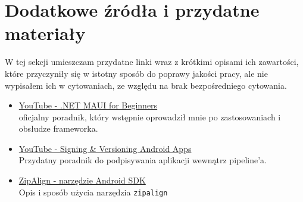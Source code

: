 \section{Dodatkowe źródła i przydatne materiały} \label{dodatkoweZrodla}
W tej sekcji umieszczam przydatne linki wraz z krótkimi opisami ich zawartości,
które przyczyniły się w istotny sposób do poprawy jakości pracy, ale nie wypisałem ich w cytowaniach,
ze względu na brak bezpośredniego cytowania.

\begin{itemize}
    \item \href{https://www.youtube.com/playlist?list=PLdo4fOcmZ0oUBAdL2NwBpDs32zwGqb9DY}{YouTube - .NET MAUI for Beginners} \\
        oficjalny poradnik, który wstępnie oprowadził mnie po zastosowaniach i obsłudze frameworka.
    \item \href{https://www.youtube.com/watch?v=s1grtSSIRVA}{YouTube - Signing \& Versioning Android Apps} \\
        Przydatny poradnik do podpisywania aplikacji wewnątrz pipeline'a.
    \item \href{https://developer.android.com/tools/zipalign}{ZipAlign - narzędzie Android SDK}\\%
        Opis i sposób użycia narzędzia \verb|zipalign|
\end{itemize}
